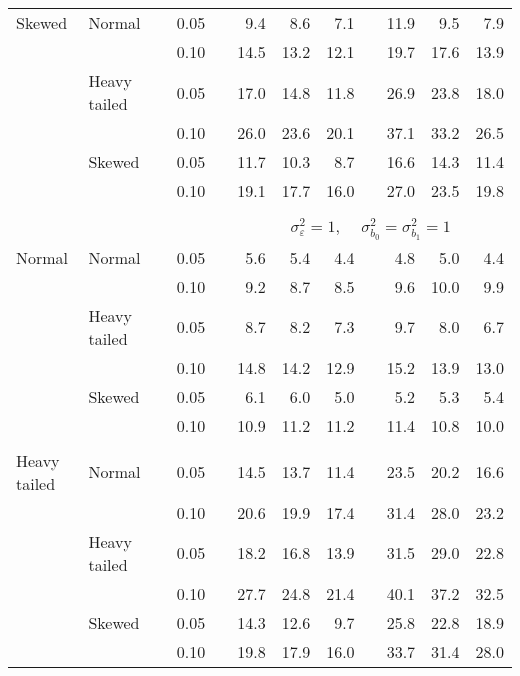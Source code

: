 \begin{table}[ht]
\begin{scriptsize}
\begin{center}
\begin{tabular}{ll p{.1cm} c p{.1cm} rrr p{.1cm} rrr}
Skewed       & Normal       && 0.05 &&   9.4 & 8.6 & 7.1 &   & 11.9 & 9.5 & 7.9 \\ 
             &              && 0.10 &&   14.5 & 13.2 & 12.1 &   & 19.7 & 17.6 & 13.9 \\ 
             & Heavy tailed && 0.05 &&   17.0 & 14.8 & 11.8 &   & 26.9 & 23.8 & 18.0 \\ 
             &              && 0.10 &&   26.0 & 23.6 & 20.1 &   & 37.1 & 33.2 & 26.5 \\ 
             & Skewed       && 0.05 &&   11.7 & 10.3 & 8.7 &   & 16.6 & 14.3 & 11.4 \\ 
             &              && 0.10 &&   19.1 & 17.7 & 16.0 &   & 27.0 & 23.5 & 19.8 \\ 

&&&&&&&&&&&\\
& && && \multicolumn{7}{c}{$\sigma_{\varepsilon}^2 = 1$, \ \ $\sigma_{b_0}^2 = \sigma_{b_1}^2 = 1$} \\ \cline{6-12}
\rowcolor{gray!20}Normal       & Normal       && 0.05 &&   5.6 & 5.4 & 4.4 &   & 4.8 & 5.0 & 4.4 \\ 
\rowcolor{gray!20}             &              && 0.10 &&   9.2 & 8.7 & 8.5 &   & 9.6 & 10.0 & 9.9 \\ 
\rowcolor{gray!20}             & Heavy tailed && 0.05 &&   8.7 & 8.2 & 7.3 &   & 9.7 & 8.0 & 6.7 \\ 
\rowcolor{gray!20}             &              && 0.10 &&   14.8 & 14.2 & 12.9 &   & 15.2 & 13.9 & 13.0 \\ 
\rowcolor{gray!20}             & Skewed       && 0.05 &&   6.1 & 6.0 & 5.0 &   & 5.2 & 5.3 & 5.4 \\ 
\rowcolor{gray!20}             &              && 0.10 &&   10.9 & 11.2 & 11.2 &   & 11.4 & 10.8 & 10.0 \\ 
&&&&&&&&&&&\\
Heavy tailed & Normal       && 0.05 &&   14.5 & 13.7 & 11.4 &   & 23.5 & 20.2 & 16.6 \\ 
             &              && 0.10 &&   20.6 & 19.9 & 17.4 &   & 31.4 & 28.0 & 23.2 \\ 
             & Heavy tailed && 0.05 &&   18.2 & 16.8 & 13.9 &   & 31.5 & 29.0 & 22.8 \\ 
             &              && 0.10 &&   27.7 & 24.8 & 21.4 &   & 40.1 & 37.2 & 32.5 \\ 
             & Skewed       && 0.05 &&   14.3 & 12.6 & 9.7 &   & 25.8 & 22.8 & 18.9 \\ 
             &              && 0.10 &&   19.8 & 17.9 & 16.0 &   & 33.7 & 31.4 & 28.0 \\ 

\end{tabular}
\end{center}
\end{scriptsize}
\end{table}

